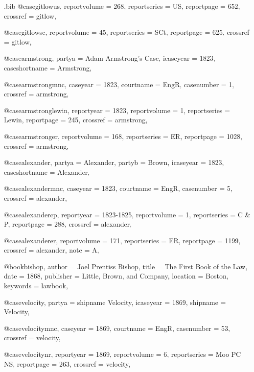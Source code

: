\begin{filecontents*}{\jobname.bib}
@case{gitlowus,
  reportvolume = {268},
  reportseries = {US},
  reportpage = {652},
  crossref = {gitlow},
}


@case{gitlowsc,
  reportvolume = {45},
  reportseries = {SCt},
  reportpage = {625},
  crossref = {gitlow},
}

@case{armstrong,
  partya = {Adam Armstrong's Case},
  icaseyear = {1823},
  caseshortname = {Armstrong},
	}

@case{armstrongmnc,
  caseyear = {1823},
  courtname = {EngR},
  casenumber = {1},
  crossref = {armstrong},
}


@case{armstronglewin,
  reportyear = {1823},
  reportvolume = {1},
  reportseries = {Lewin},
  reportpage = {245},
  crossref = {armstrong},
}

@case{armstronger,
  reportvolume = {168},
  reportseries = {ER},
  reportpage = {1028},
  crossref = {armstrong},
}




@case{alexander,
  partya = {Alexander},
  partyb = {Brown},
  icaseyear = {1823},
  caseshortname = {Alexander},
	}

@case{alexandermnc,
  caseyear = {1823},
  courtname = {EngR},
  casenumber = {5},
  crossref = {alexander},
}


@case{alexandercp,
  reportyear = {1823-1825},
  reportvolume = {1},
  reportseries = {C \& P},
  reportpage = {288},
  crossref = {alexander},
}

@case{alexanderer,
  reportvolume = {171},
  reportseries = {ER},
  reportpage = {1199},
  crossref = {alexander},
  note = {A},
}




@book{bishop,
author = {Joel Prentiss Bishop},
title = {The First Book of the Law},
date = {1868},
publisher = {Little, Brown, and Company},
location = {Boston},
keywords = {lawbook},
}


@case{velocity,
  partya = {shipname Velocity},
  icaseyear = {1869},
  shipname = {Velocity},
	}

@case{velocitymnc,
  caseyear = {1869},
  courtname = {EngR},
  casenumber = {53},
  crossref = {velocity},
}


@case{velocitynr,
  reportyear = {1869},
  reportvolume = {6},
  reportseries = {Moo PC NS},
  reportpage = {263},
  crossref = {velocity},
}


\end{filecontents*}
